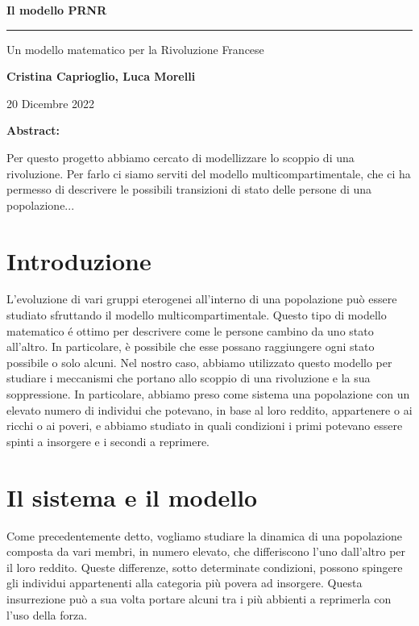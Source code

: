 \begin{center}
	\huge \textbf{Il modello PRNR}
	
	\rule{7cm}{0.4pt} 
	
	\LARGE Un modello matematico per la Rivoluzione Francese
	
	\vspace{20pt}
	
	\LARGE \textbf{Cristina Caprioglio, Luca Morelli}
	
	\vspace{5pt}
	
	\LARGE 20 Dicembre 2022
	
	\vspace{20pt}
 
	\normalsize\textbf{Abstract:}\\
\end{center}
Per questo progetto abbiamo cercato di modellizzare lo scoppio di una rivoluzione. Per farlo ci siamo serviti del modello multicompartimentale, che ci ha permesso di descrivere le possibili transizioni di stato delle persone di una popolazione...

\vspace{20pt}

\section*{Introduzione}
L'evoluzione di vari gruppi eterogenei all'interno di una popolazione può essere studiato sfruttando il modello multicompartimentale. Questo tipo di modello matematico é ottimo per descrivere come le persone cambino da uno stato all'altro. In particolare, è possibile che esse possano raggiungere ogni stato possibile o solo alcuni. Nel nostro caso, abbiamo utilizzato questo modello per studiare i meccanismi che portano allo scoppio di una rivoluzione e la sua soppressione. In particolare, abbiamo preso come sistema una popolazione con un elevato numero di individui che potevano, in base al loro reddito, appartenere o ai ricchi o ai poveri, e abbiamo studiato in quali condizioni i primi potevano essere spinti a insorgere e i secondi a reprimere. 
\section{Il sistema e il modello}
Come precedentemente detto, vogliamo studiare la dinamica di una popolazione composta da vari membri, in numero elevato, che differiscono l'uno dall'altro per il loro reddito. Queste differenze, sotto determinate condizioni, possono spingere gli individui appartenenti alla categoria più povera ad insorgere. Questa insurrezione può a sua volta portare alcuni tra i più abbienti a reprimerla con l'uso della forza.\\

